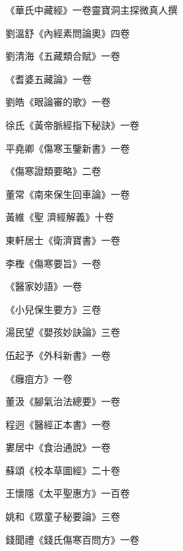 \begin{pinyinscope}
 《華氏中藏經》一卷靈寶洞主探微真人撰



 劉溫舒《內經素問論奧》四卷



 劉清海《五藏類合賦》一卷



 《耆婆五藏論》一卷



 劉皓《眼論審的歌》一卷



 徐氏《黃帝脈經指下秘訣》一卷



 平堯卿《傷寒玉鑒新書》一卷



 《傷寒證類要略》二卷



 董常《南來保生回車論》一卷



 黃維《聖
 濟經解義》十卷



 東軒居士《衛濟寶書》一卷



 李檉《傷寒要旨》一卷



 《醫家妙語》一卷



 《小兒保生要方》三卷



 湯民望《嬰孩妙訣論》三卷



 伍起予《外科新書》一卷



 《癰疽方》一卷



 董汲《腳氣治法總要》一卷



 程迥《醫經正本書》一卷



 婁居中《食治通說》一卷



 蘇頌《校本草圖經》二十卷



 王懷隱《太平聖惠方》一百卷



 姚和《眾童子秘要論》三卷



 錢聞禮《錢氏傷寒百問方》一卷




\end{pinyinscope}
